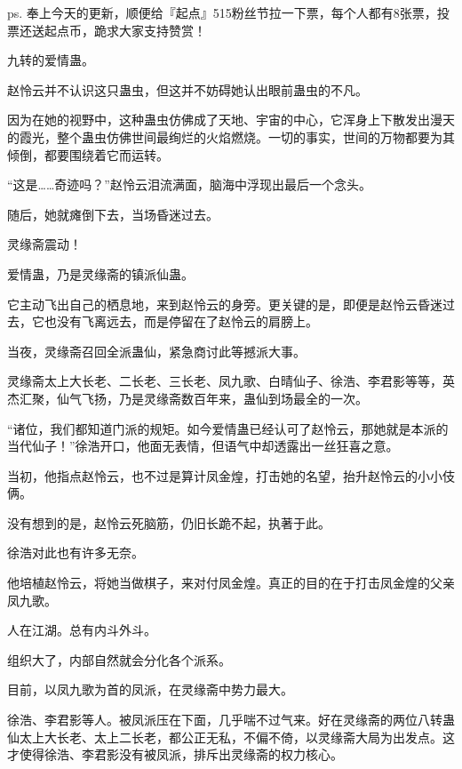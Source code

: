 
\begin{this_body}



ps. 奉上今天的更新，顺便给『起点』515粉丝节拉一下票，每个人都有8张票，投票还送起点币，跪求大家支持赞赏！

九转的爱情蛊。

赵怜云并不认识这只蛊虫，但这并不妨碍她认出眼前蛊虫的不凡。

因为在她的视野中，这种蛊虫仿佛成了天地、宇宙的中心，它浑身上下散发出漫天的霞光，整个蛊虫仿佛世间最绚烂的火焰燃烧。一切的事实，世间的万物都要为其倾倒，都要围绕着它而运转。

“这是……奇迹吗？”赵怜云泪流满面，脑海中浮现出最后一个念头。

随后，她就瘫倒下去，当场昏迷过去。

灵缘斋震动！

爱情蛊，乃是灵缘斋的镇派仙蛊。

它主动飞出自己的栖息地，来到赵怜云的身旁。更关键的是，即便是赵怜云昏迷过去，它也没有飞离远去，而是停留在了赵怜云的肩膀上。

当夜，灵缘斋召回全派蛊仙，紧急商讨此等撼派大事。

灵缘斋太上大长老、二长老、三长老、凤九歌、白晴仙子、徐浩、李君影等等，英杰汇聚，仙气飞扬，乃是灵缘斋数百年来，蛊仙到场最全的一次。

“诸位，我们都知道门派的规矩。如今爱情蛊已经认可了赵怜云，那她就是本派的当代仙子！”徐浩开口，他面无表情，但语气中却透露出一丝狂喜之意。

当初，他指点赵怜云，也不过是算计凤金煌，打击她的名望，抬升赵怜云的小小伎俩。

没有想到的是，赵怜云死脑筋，仍旧长跪不起，执著于此。

徐浩对此也有许多无奈。

他培植赵怜云，将她当做棋子，来对付凤金煌。真正的目的在于打击凤金煌的父亲凤九歌。

人在江湖。总有内斗外斗。

组织大了，内部自然就会分化各个派系。

目前，以凤九歌为首的凤派，在灵缘斋中势力最大。

徐浩、李君影等人。被凤派压在下面，几乎喘不过气来。好在灵缘斋的两位八转蛊仙太上大长老、太上二长老，都公正无私，不偏不倚，以灵缘斋大局为出发点。这才使得徐浩、李君影没有被凤派，排斥出灵缘斋的权力核心。


\end{this_body}
